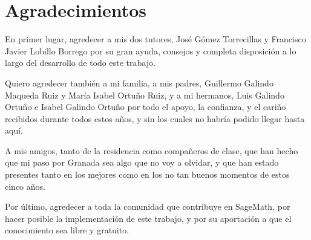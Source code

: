 

\chapter{Agradecimientos}

En primer lugar, agredecer a mis dos tutores, José Gómez Torrecillas y Francisco
Javier Lobillo Borrego por su gran ayuda, consejos y completa disposición a lo
largo del desarrollo de todo este trabajo.

Quiero agredecer también a mi familia, a mis padres, Guillermo Galindo Maqueda
Ruiz y María Isabel Ortuño Ruiz, y a mi hermanos, Luis Galindo Ortuño e Isabel
Galindo Ortuño por todo el apoyo, la confianza, y el cariño recibidos durante todos
estos años, y sin los cuales no habría podido llegar hasta aquí.

A mis amigos, tanto de la residencia como compañeros de clase, que han hecho
que mi paso por Granada sea algo que no voy a olvidar, y que han estado presentes
tanto en los mejores como en los no tan buenos momentos de estos cinco años.

Por último, agredecer a toda la comunidad que contribuye en SageMath, por hacer posible
la implementación de este trabajo, y por su aportación a que el conocimiento sea libre
y gratuito.
\cleardoublepage
\endinput
